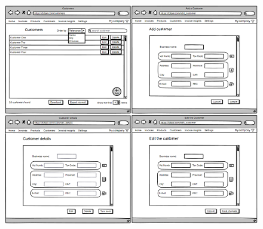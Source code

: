 \begin{figure}[h!]
    \centering
    \includegraphics[height=420pt, keepaspectratio]{resources/mockup/Customer.png}
\end{figure}


\newpage

